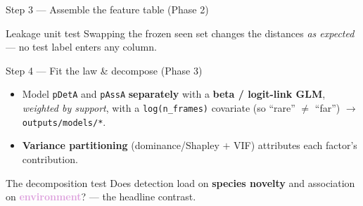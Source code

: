 \documentclass[aspectratio=169,11pt]{beamer}
\begin{document}
\begin{frame}{Step 3 --- Assemble the feature table \small(Phase 2)}
  \centering
  \vspace{0.5em}
  \begin{block}{Leakage unit test}
    \centering\footnotesize Swapping the frozen seen set changes the distances \emph{as expected} ---
    no test label enters any column.
  \end{block}
\end{frame}

\begin{frame}{Step 4 --- Fit the law \& decompose \small(Phase 3)}
  \begin{itemize}
    \item Model \texttt{pDetA} and \texttt{pAssA} \textbf{separately} with a \textbf{beta / logit-link GLM},
          \emph{weighted by support}, with a \texttt{log(n\_frames)} covariate (so ``rare'' $\ne$ ``far'')
          $\to$ \texttt{outputs/models/*}.
    \item \textbf{Variance partitioning} (dominance/Shapley $+$ VIF) attributes each factor's contribution.
  \end{itemize}
  \vspace{0.3em}
  \begin{block}{The decomposition test}
    \centering\footnotesize Does detection load on \textcolor{forest}{\textbf{species novelty}} and
    association on \textcolor{plum}{\textbf{environment}}? --- the headline contrast.
  \end{block}
\end{frame}
\end{document}

